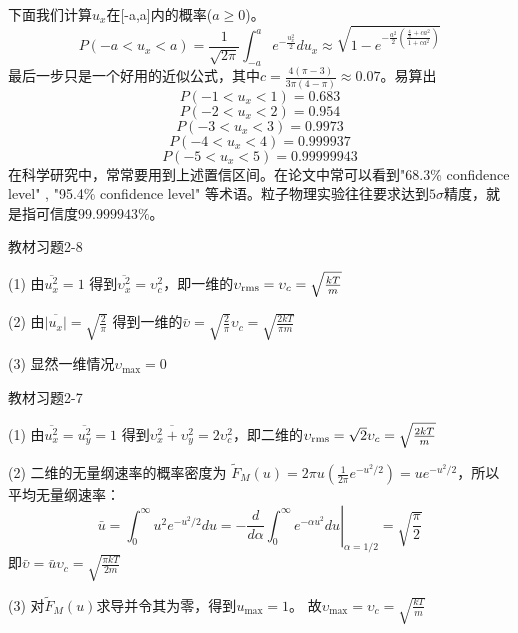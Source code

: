 \documentclass[CJK]{beamer}
\begin{document}
\begin{frame}
\bch
{\scriptsize
下面我们计算$u_x$在[-a,a]内的概率($a\ge 0$)。
$$P(-a<u_x<a) = \frac{1}{\sqrt{2\pi}} \int_{-a}^a e^{-\frac{u_x^2}{2}}du_x \approx  \sqrt{1-e^{-\frac{a^2}{2}\left(\frac{\frac{4}{\pi}+ca^2}{1+ca^2}\right)}}$$
最后一步只是一个好用的近似公式，其中$c = \frac{4(\pi-3)}{3\pi(4-\pi)} \approx 0.07$。易算出
$$P(-1<u_x<1) =  0.683$$
$$P(-2<u_x<2) = 0.954$$
$$P(-3<u_x<3) = 0.9973$$
$$P(-4<u_x<4) = 0.999937$$
$$P(-5<u_x<5) = 0.99999943$$
在科学研究中，常常要用到上述置信区间。在论文中常可以看到"68.3\% confidence level" , "95.4\% confidence level" 等术语。粒子物理实验往往要求达到$5\sigma$精度，就是指可信度$99.999943\%$。
}
\ech
\end{frame}



\begin{frame}
\bch
{\blue 教材习题2-8}

{\scriptsize
\bitem
\item[(1)]{由$\overline{u_x^2} = 1$ 得到$\overline{\upsilon_x^2} = \upsilon_c^2$，即一维的$\upsilon_{\rm rms} = \upsilon_c = \sqrt{\frac{kT}{m}}$}
\item[(2)]{由$\overline{|u_x|} = \sqrt{\frac{2}{\pi}}$  得到一维的$\bar{\upsilon} =  \sqrt{\frac{2}{\pi}}\upsilon_c = \sqrt{\frac{2kT}{\pi m}}$}
\item[(3)]{显然一维情况$\upsilon_{\max} = 0$}
\eitem

}
\ech
\end{frame}


\begin{frame}
\bch
{\blue 教材习题2-7}

{\scriptsize
\bitem
\item[(1)]{由$\overline{u_x^2} = \overline{u_y^2} = 1$ 得到$\overline{\upsilon_x^2+\upsilon_y^2} = 2\upsilon_c^2$，即二维的$\upsilon_{\rm rms} = \sqrt{2}\upsilon_c = \sqrt{\frac{2kT}{m}}$}
\item[(2)]{二维的无量纲速率的概率密度为 $\tilde{F}_M(u) = 2\pi u \left(\frac{1}{2\pi} e^{-u^2/2}\right)= u e^{-u^2/2}$，所以平均无量纲速率：
$$\bar{u} = \int_0^\infty u^2 e^{-u^2/2} du = -\left.\frac{d}{d\alpha}\int_0^\infty e^{-\alpha u^2}du\right\vert_{\alpha=1/2}= \sqrt{\frac{\pi}{2}}$$ 
即$\bar{\upsilon} = \bar{u}\upsilon_c = \sqrt{\frac{\pi kT}{2m}}$
}
\item[(3)]{对$\tilde{F}_M(u)$求导并令其为零，得到$u_{\max} = 1$。 故$\upsilon_{\max} = \upsilon_c = \sqrt{\frac{kT}{m}}$}
\eitem

}
\ech
\end{frame}
\end{document}
